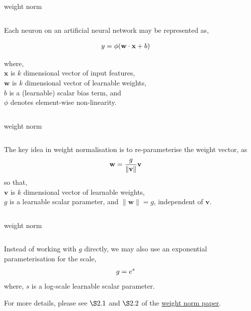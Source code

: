 \documentclass[aspectratio=169,xcolor={dvipsnames,svgnames}]{beamer}
\begin{document}
\begin{frame}[label={sec:weight-norm}]{weight norm}
\begin{columns}
\begin{column}{0.7\columnwidth}
Each neuron on an artificial neural network may be
represented as,

\begin{align}
\notag
y &= \phi(\mathbf{w}\cdot\mathbf{x}+b)
\end{align}

where, \\[0pt]
\(\mathbf{x}\) is \(k\) dimensional vector of input
features, \\[0pt]
\(\mathbf{w}\) is \(k\) dimensional vector of learnable
weights, \\[0pt]
\(b\) is a (learnable) scalar bias term, and \\[0pt]
\(\phi\) denotes element-wise non-linearity.
\end{column}
\end{columns}
\end{frame}

\begin{frame}[label={sec:orge4b4365}]{weight norm}
\begin{columns}
\begin{column}{0.45\columnwidth}
The \alert{key idea} in weight normalisation is to
re-parameterise the weight vector, as
\begin{align}
  \notag
  \mathbf{w} &= \frac{g}{\|\mathbf{v}\|} \mathbf{v}
\end{align}
so that, \\[0pt]
\(\mathbf{v}\) is \(k\) dimensional vector of learnable
weights, \\[0pt]
\(g\) is a learnable scalar parameter, and 
\(\|\mathbf{w}\|=g\), independent of \(\mathbf{v}\).
\end{column}
\end{columns}
\end{frame}
\begin{frame}[label={sec:orgc0b5da4}]{weight norm}
\begin{columns}
\begin{column}{0.45\columnwidth}
Instead of working with \(g\) directly, we may also use
an exponential parameterisation for the scale,
\begin{align}
  \notag
  g &= e^s
\end{align}
where, \(s\) is a log-scale learnable scalar parameter.

For more details, please see \(\S 2.1\) and \(\S 2.2\) of
the \href{http://arxiv.org/abs/1602.07868}{weight norm paper}.
\end{column}
\end{columns}
\end{frame}
\end{document}
